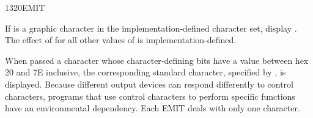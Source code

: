 \begin{worddef}{1320}{EMIT}
\item {}

	If  is a graphic character in the implementation-defined
	character set, display . The effect of  for all
	other values of  is implementation-defined.

	When passed a character whose character-defining bits have a
	value between hex 20 and 7E inclusive, the corresponding
	standard character, specified by , is displayed. Because different output
	devices can respond differently to control characters, programs
	that use control characters to perform specific functions have
	an environmental dependency. Each EMIT deals with only one
	character.



\end{worddef}
